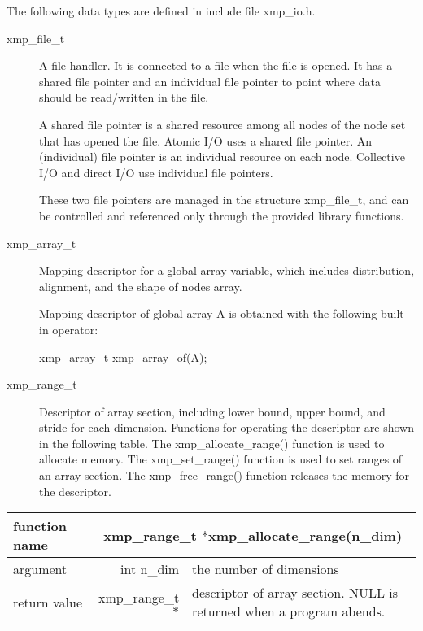    The following data types are defined in include file xmp\_io.h.
   \begin{description}
    \item[xmp\_file\_t] A file handler.
	       It is connected to a file when the file is opened.
	       It has a shared file pointer and an individual file pointer
	       to point where data should be read/written in the file.

	       A shared file pointer is a shared resource among all nodes of the node set
             that has opened the file. Atomic I/O uses a shared file pointer.
	       An (individual) file pointer is an individual resource on each node. 
	       Collective I/O and direct I/O use individual file pointers.
	       
	       These two file pointers are managed in the structure xmp\_file\_t,
	       and can be controlled and referenced only through
	       the provided library functions.
    \item[xmp\_array\_t] Mapping descriptor for a global array variable,
	       which includes distribution, alignment, and the shape of nodes array.

	       Mapping descriptor of global array A is obtained with
	       the following built-in operator:
	       
	       xmp\_array\_t xmp\_array\_of(A);
\fi

\item[xmp\_range\_t] Descriptor of array section, including
      lower bound, upper bound, and stride for each dimension.
      Functions for operating the descriptor are shown in the following table.
      The xmp\_allocate\_range() function is used to allocate memory.
      The xmp\_set\_range() function is used to set ranges of an array section.
      The xmp\_free\_range() function releases the memory for the descriptor.
   \end{description}

   \begin{table}[h]
    \begin{center}
      \begin{tabular}{|l|r|p{90mm}|}
      \hline
      {\bf function name}  & \multicolumn{2}{c|}{\bf xmp\_range\_t $*$xmp\_allocate\_range(n\_dim)}  \\ \hline \hline
      argument & int n\_dim & the number of dimensions \\ \hline
      return value & xmp\_range\_t$*$ & descriptor of array section. NULL is returned
	      when a program abends. \\ \hline
      \end{tabular}
     \end{center}
    \label{tb:aaa}
   \end{table}

